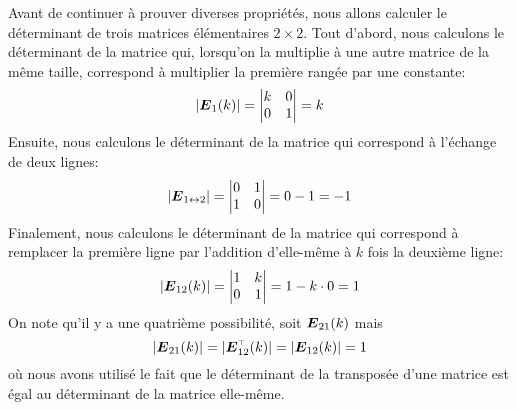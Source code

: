 Avant de continuer à prouver diverses propriétés, nous allons calculer le déterminant de trois matrices 
élémentaires $2\times 2$.  Tout d'abord, nous calculons le déterminant de la matrice qui, 
lorsqu'on la multiplie à une autre matrice de la même taille, correspond à multiplier la première rangée par une 
constante:
\[
|\boldsymbol{E}_1(k)| = \begin{vmatrix}
k & 0\\
0 & 1
\end{vmatrix} = k
\]
Ensuite, nous calculons le déterminant de la matrice qui correspond à l'échange de deux lignes:
\[
|\boldsymbol{E}_{1 \leftrightarrow 2}| = \begin{vmatrix}
0 & 1\\
1 & 0
\end{vmatrix} = 0-1 = -1
\]
Finalement, nous calculons le déterminant de la matrice qui correspond à remplacer la première ligne par l'addition d'elle-même à  $k$ fois la deuxième ligne:
\[
|\boldsymbol{E}_{12}(k)| = \begin{vmatrix}
1 & k \\
0 & 1
\end{vmatrix} = 1 - k\cdot 0 = 1
\]
On note qu'il y a une quatrième possibilité, soit $\boldsymbol{E}_{21}(k)$ mais 
\[
\left|\matE_{21}(k)\right| = \left|\transp{\matE}_{12}(k)\right| =\left|\matE_{12}(k)\right| = 1
\]
où nous avons utilisé le fait que le déterminant de la transposée d'une matrice est égal au déterminant de la matrice elle-même.

